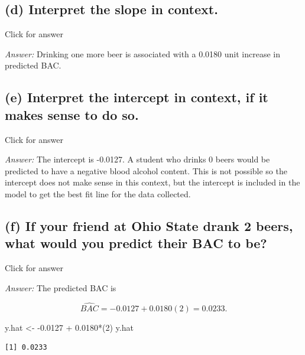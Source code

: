 \documentclass[
]{book}
\newenvironment{Shaded}{\begin{snugshade}}{\end{snugshade}}
\newcommand{\DecValTok}[1]{\textcolor[rgb]{0.00,0.00,0.81}{#1}}
\newcommand{\FloatTok}[1]{\textcolor[rgb]{0.00,0.00,0.81}{#1}}
\newcommand{\NormalTok}[1]{#1}
\newcommand{\OtherTok}[1]{\textcolor[rgb]{0.56,0.35,0.01}{#1}}
\newcommand{\SpecialCharTok}[1]{\textcolor[rgb]{0.00,0.00,0.00}{#1}}
\begin{document}
\hypertarget{d-interpret-the-slope-in-context.}{%
\subsection{(d) Interpret the slope in context.}\label{d-interpret-the-slope-in-context.}}

Click for answer

\emph{Answer:} Drinking one more beer is associated with a 0.0180 unit increase in predicted BAC.

\hypertarget{e-interpret-the-intercept-in-context-if-it-makes-sense-to-do-so.}{%
\subsection{(e) Interpret the intercept in context, if it makes sense to do so.}\label{e-interpret-the-intercept-in-context-if-it-makes-sense-to-do-so.}}

Click for answer

\emph{Answer:} The intercept is -0.0127. A student who drinks 0 beers would be predicted to have a negative blood alcohol content. This is not possible so the intercept does not make sense in this context, but the intercept is included in the model to get the best fit line for the data collected.

\hypertarget{f-if-your-friend-at-ohio-state-drank-2-beers-what-would-you-predict-their-bac-to-be}{%
\subsection{(f) If your friend at Ohio State drank 2 beers, what would you predict their BAC to be?}\label{f-if-your-friend-at-ohio-state-drank-2-beers-what-would-you-predict-their-bac-to-be}}

Click for answer

\emph{Answer:} The predicted BAC is

\[
\widehat{BAC} = -0.0127 + 0.0180(2) = 0.0233.
\]

\begin{Shaded}
\begin{Highlighting}[]
\NormalTok{y.hat }\OtherTok{\textless{}{-}} \SpecialCharTok{{-}}\FloatTok{0.0127} \SpecialCharTok{+} \FloatTok{0.0180}\SpecialCharTok{*}\NormalTok{(}\DecValTok{2}\NormalTok{) }
\NormalTok{y.hat}
\end{Highlighting}
\end{Shaded}

\begin{verbatim}
[1] 0.0233
\end{verbatim}
\end{document}
